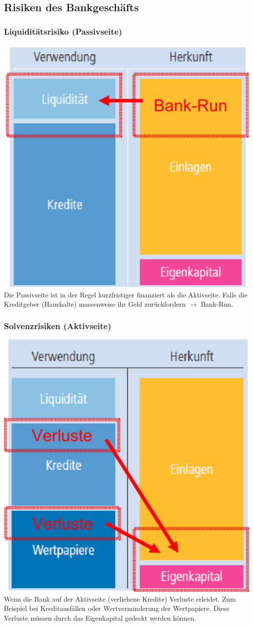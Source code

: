\subsection{Risiken des Bankgeschäfts}
\begin{multicols}{2}
	\subsubsection{Liquiditätsrisiko (Passivseite)}
	\includegraphics[width=0.5\linewidth]{images/liquiditaetsrisiko.png}\\
	Die Passivseite ist in der Regel kurzfristiger finanziert als die Aktivseite. Falls die Kreditgeber (Haushalte) massenweise ihr Geld zurückfordern $\rightarrow$ Bank-Run.
	\vfill\null
	\columnbreak
	\subsubsection{Solvenzrisiken (Aktivseite)}
	\includegraphics[width=0.5\linewidth]{images/solvenzrisiken.png}\\
	Wenn die Bank auf der Aktivseite (verliehene Kredite) Verluste erleidet. Zum Beispiel bei Kreditausfällen oder Wertverminderung der Wertpapiere. Diese Verluste müssen durch das Eigenkapital gedeckt werden können.
\end{multicols}

